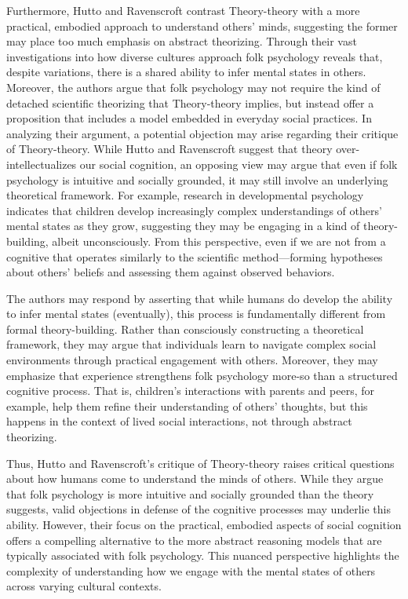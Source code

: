 \documentclass[11pt]{article}
\begin{document}
Furthermore, Hutto and Ravenscroft contrast Theory-theory with a more practical, embodied approach to understand others' minds, suggesting the former may place too much emphasis on abstract theorizing. Through their vast investigations into how diverse cultures approach folk psychology reveals that, despite variations, there is a shared ability to infer mental states in others. Moreover, the authors argue that folk psychology may not require the kind of detached scientific theorizing that Theory-theory implies, but instead offer a proposition that includes a model embedded in everyday social practices. 
In analyzing their argument, a potential objection may arise regarding their critique of Theory-theory. While Hutto and Ravenscroft suggest that theory over-intellectualizes our social cognition, an opposing view may argue that even if folk psychology is intuitive and socially grounded, it may still involve an underlying theoretical framework. For example, research in developmental psychology indicates that children develop increasingly complex understandings of others' mental states as they grow, suggesting they may be engaging in a kind of theory-building, albeit unconsciously. From this perspective, even if we are not from a cognitive that operates similarly to the scientific method—forming hypotheses about others' beliefs and assessing them against observed behaviors. 

The authors may respond by asserting that while humans do develop the ability to infer mental states (eventually), this process is fundamentally different from formal theory-building. Rather than consciously constructing a theoretical framework, they may argue that individuals learn to navigate complex social environments through practical engagement with others. Moreover, they may emphasize that experience strengthens folk psychology more-so than a structured cognitive process. That is, children's interactions with parents and peers, for example, help them refine their understanding of others' thoughts, but this happens in the context of lived social interactions, not through abstract theorizing. 

Thus, Hutto and Ravenscroft's critique of Theory-theory raises critical questions about how humans come to understand the minds of others. While they argue that folk psychology is more intuitive and socially grounded than the theory suggests, valid objections in defense of the cognitive processes may underlie this ability. However, their focus on the practical, embodied aspects of social cognition offers a compelling alternative to the more abstract reasoning models that are typically associated with folk psychology. This nuanced perspective highlights the complexity of understanding how we engage with the mental states of others across varying cultural contexts.
\end{document}
